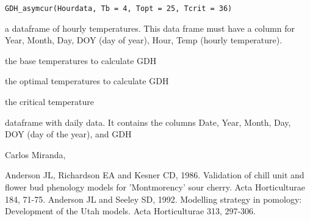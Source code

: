 \documentclass[a4paper]{book}
\begin{document}
%
\begin{Usage}
\begin{verbatim}
GDH_asymcur(Hourdata, Tb = 4, Topt = 25, Tcrit = 36)
\end{verbatim}
\end{Usage}
%
\begin{Arguments}
\begin{ldescription}
\item[\code{Hourdata}] a dataframe of hourly temperatures. This data frame
must have a column for Year, Month, Day, DOY (day of year), Hour,
Temp (hourly temperature).

\item[\code{Tb}] the base temperatures to calculate GDH

\item[\code{Topt}] the optimal temperatures to calculate GDH

\item[\code{Tcrit}] the critical temperature
\end{ldescription}
\end{Arguments}
%
\begin{Value}
dataframe with daily data. It contains the columns Date,
Year, Month, Day, DOY (day of the year), and GDH
\end{Value}
%
\begin{Author}\relax
Carlos Miranda, 
\end{Author}
%
\begin{References}\relax
Anderson JL, Richardson EA and Kesner CD, 1986. Validation of chill
unit and flower bud phenology models for 'Montmorency' sour cherry.
Acta Horticulturae 184, 71-75.
Anderson JL and Seeley SD, 1992. Modelling strategy in pomology:
Development of the Utah models. Acta Horticulturae 313, 297-306.
\end{References}
%
\begin{Examples}
\end{Examples}
\end{document}
